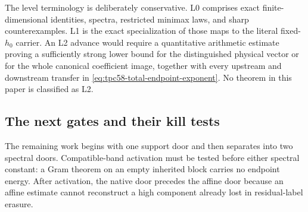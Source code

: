 The level terminology is deliberately conservative.  L0 comprises exact
finite-dimensional identities, spectra, restricted minimax laws, and sharp
counterexamples.  L1 is the exact specialization of those maps to the
literal fixed-\(h_0\) carrier.  An L2 advance would require a quantitative
arithmetic estimate proving a sufficiently strong lower bound for the
distinguished physical vector or for the whole canonical coefficient image,
together with every upstream and downstream transfer in
\eqref{eq:tpc58-total-endpoint-exponent}.  No theorem in this paper is
classified as L2.

\subsection{The next gates and their kill tests}

The remaining work begins with one support door and then separates into two
spectral doors.  Compatible-band activation must be tested before either
spectral constant: a Gram theorem on an empty inherited block carries no
endpoint energy.  After activation, the native door precedes the affine
door because an affine estimate cannot reconstruct a high component already
lost in residual-label erasure.

